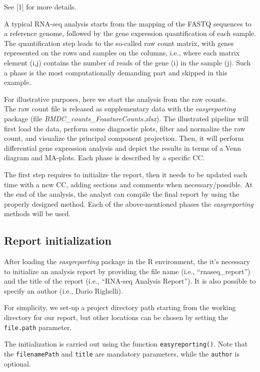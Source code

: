 \documentclass[]{article}
\begin{document}
See {[}1{]} for more details.

A typical RNA-seq analysis starts from the mapping of the FASTQ
sequences to a reference genome, followed by the gene expression
quantification of each sample. The quantification step leads to the
so-called raw count matrix, with genes represented on the rows and
samples on the columns, i.e., where each matrix element (i,j) contains
the number of reads of the gene (i) in the sample (j). Such a phase is
the most computationally demanding part and skipped in this example.

For illustrative purposes, here we start the analysis from the raw
counts.\\
The raw count file is released as supplementary data with the
\emph{easyreporting} package (file
\emph{BMDC\_counts\_FeaatureCounts.xlsx}). The illustrated pipeline will
first load the data, perform some diagnostic plots, filter and normalize
the raw count, and visualize the principal component projection. Then,
it will perform differential gene expression analysis and depict the
results in terms of a Venn diagram and MA-plots. Each phase is described
by a specific CC.

The first step requires to initialize the report, then it needs to be
updated each time with a new CC, adding sections and comments when
necessary/possible. At the end of the analysis, the analyst can compile
the final report by using the properly designed method. Each of the
above-mentioned phases the \emph{easyreporting} methods will be used.

\hypertarget{report-initialization}{%
\subsection{Report initialization}\label{report-initialization}}

After loading the \emph{easyreporting} package in the R environment, the
it's necessary to initialize an analysis report by providing the file
name (i.e., ``rnaseq\_report'') and the title of the report (i.e.,
``RNA-seq Analysis Report''). It is also possible to specify an author
(i.e., Dario Righelli).

For simplicity, we set-up a project directory path starting from the
working directory for our report, but other locations can be chosen by
setting the \texttt{file.path} parameter.

The initialization is carried out using the function
\texttt{easyreporting()}. Note that the \texttt{filenamePath} and
\texttt{title} are mandatory parameters, while the \texttt{author} is
optional.
\end{document}

